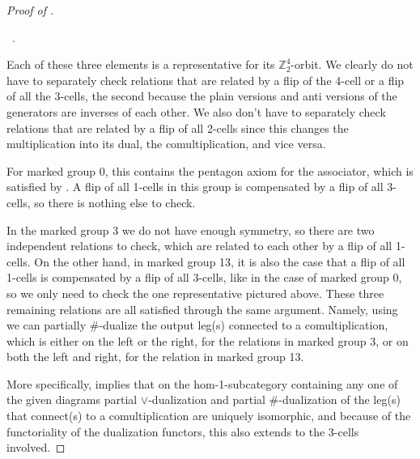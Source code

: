 \documentclass[12pt,a4paper]{article}
\numberwithin{equation}{section}
\begin{document}
\begin{proof}[Proof of ]
\begin{center}
\begin{tikzpicture}[scale=0.5]
        \end{tikzpicture}\, .
    \end{center}

    Each of these three elements is a representative for its $\mathbb{Z}_2^4$-orbit. We clearly do not have to separately check relations that are related by a flip of the 4-cell or a flip of all the 3-cells, the second because the plain versions and anti versions of the generators are inverses of each other. We also don't have to separately check relations that are related by a flip of all 2-cells since this changes the multiplication into its dual, the comultiplication, and vice versa.

    For marked group 0, this contains the pentagon axiom for the associator, which is satisfied by . A flip of all 1-cells in this group is compensated by a flip of all 3-cells, so there is nothing else to check.

    In the marked group 3 we do not have enough symmetry, so there are two independent relations to check, which are related to each other by a flip of all 1-cells. On the other hand, in marked group 13, it is also the case that a flip of all 1-cells is compensated by a flip of all 3-cells, like in the case of marked group 0, so we only need to check the one representative pictured above. These three remaining relations are all satisfied through the same argument. Namely, using  we can partially $\#$-dualize the output leg(s) connected to a comultiplication, which is either on the left or the right, for the relations in marked group 3, or on both the left and right, for the relation in marked group 13.

    More specifically,  implies that on the hom-1-subcategory containing any one of the given diagrams partial $\vee$-dualization and partial $\#$-dualization of the leg(s) that connect(s) to a comultiplication are uniquely isomorphic, and because of the functoriality of the dualization functors, this also extends to the 3-cells involved.
    

\end{proof}
\end{document}

